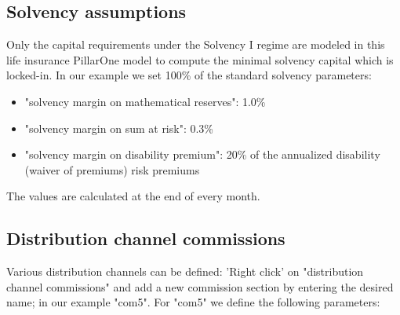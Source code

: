 \subsection{Solvency assumptions}

Only the capital requirements under the Solvency I regime are modeled in this life insurance PillarOne model to compute the minimal solvency capital which is locked-in. In our example we set 100\% of the standard solvency parameters:
\begin{itemize}
	\item "solvency margin on mathematical reserves": 1.0\%
	\item "solvency margin on sum at risk": 0.3\%
	\item "solvency margin on disability premium": 20\% of the annualized disability (waiver of premiums) risk premiums
\end{itemize}
The values are calculated at the end of every month.

\subsection{Distribution channel commissions}

Various distribution channels can be defined: 'Right click' on "distribution channel commissions" and add a new commission section by entering the desired name; in our example "com5".
For "com5" we define the following parameters:

